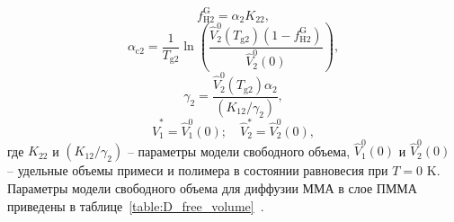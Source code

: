 \begin{equation}
	f_{\mathrm{H} 2}^{\mathrm{G}}=\alpha_2 K_{22},
\end{equation}
\begin{equation}
	\alpha_{\mathrm{c} 2}=\frac{1}{T_{\mathrm{g} 2}} \ln \left(\frac{\hat{V}_2^0\left(T_{\mathrm{g} 2}\right)\left(1-f_{\mathrm{H} 2}^{\mathrm{G}}\right)}{\hat{V}_2^0(0)}\right),
\end{equation}
\begin{equation}
	\gamma_2=\frac{\hat{V}_2^0\left(T_{\mathrm{g} 2}\right) \alpha_2}{\left(K_{12} / \gamma_2\right)},
\end{equation}
\begin{equation}
	\hat{V}_1^*=\hat{V}_1^0(0); \hspace{1em} \hat{V}_2^*=\hat{V}_2^0(0),
\end{equation}
где $K_{22}$ и $\left(K_{12} / \gamma_2\right)$ -- параметры модели свободного объема, $\hat{V}_1^0(0)$ и $\hat{V}_2^0(0)$ -- удельные объемы примеси и полимера в состоянии равновесия при $T=0$ K. Параметры модели свободного объема для диффузии ММА в слое ПММА приведены в таблице~\ref{table:D_free_volume}~\cite{Tonge_free_volume_parameters}.

